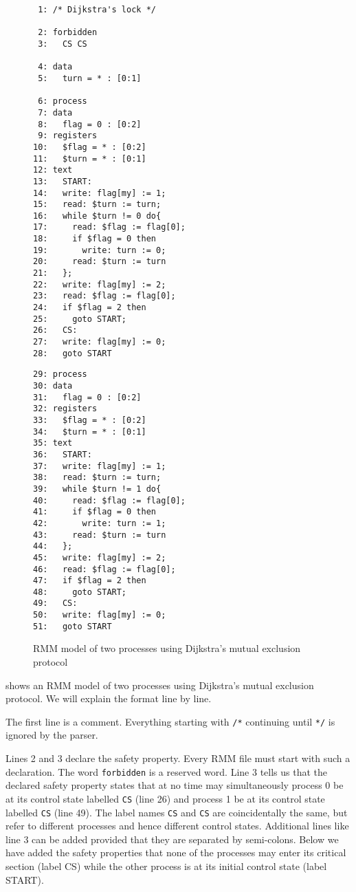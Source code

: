 \documentclass[a4paper]{article}
\begin{document}
\begin{figure}[ht]
\begin{minipage}[b]{0.5\linewidth}
\small{
\begin{verbatim}
 1: /* Dijkstra's lock */
   
 2: forbidden
 3:   CS CS
   
 4: data
 5:   turn = * : [0:1]
   
 6: process
 7: data
 8:   flag = 0 : [0:2]
 9: registers
10:   $flag = * : [0:2]
11:   $turn = * : [0:1]
12: text
13:   START:
14:   write: flag[my] := 1;
15:   read: $turn := turn;
16:   while $turn != 0 do{
17:     read: $flag := flag[0];
18:     if $flag = 0 then
19:       write: turn := 0;
20:     read: $turn := turn
21:   };
22:   write: flag[my] := 2;
23:   read: $flag := flag[0];
24:   if $flag = 2 then
25:     goto START;
26:   CS:
27:   write: flag[my] := 0;
28:   goto START
\end{verbatim}
}
\end{minipage}
\hspace{0pt}
\begin{minipage}[b]{0.45\linewidth}
\small{
\begin{verbatim}
29: process
30: data
31:   flag = 0 : [0:2]
32: registers
33:   $flag = * : [0:2]
34:   $turn = * : [0:1]
35: text
36:   START:
37:   write: flag[my] := 1;
38:   read: $turn := turn;
39:   while $turn != 1 do{
40:     read: $flag := flag[0];
41:     if $flag = 0 then
42:       write: turn := 1;
43:     read: $turn := turn
44:   };
45:   write: flag[my] := 2;
46:   read: $flag := flag[0];
47:   if $flag = 2 then
48:     goto START;
49:   CS:
50:   write: flag[my] := 0;
51:   goto START
\end{verbatim}
}
\end{minipage}
\caption{RMM model of two processes using Dijkstra's mutual exclusion protocol\cite{LP93}}\label{fig:code:dijkstra.rmm}
\end{figure}

 shows an RMM model of two processes using
Dijkstra's mutual exclusion protocol. We will explain the format line
by line.

The first line is a comment. Everything starting with \verb+/*+
continuing until \verb+*/+ is ignored by the parser.

Lines 2 and 3 declare the safety property. Every RMM file must start
with such a declaration. The word \verb+forbidden+ is a reserved
word. Line 3 tells us that the declared safety property states that at
no time may simultaneously process 0 be at its control state labelled
\verb+CS+ (line 26) and process 1 be at its control state labelled
\verb+CS+ (line 49). The label names \verb+CS+ and \verb+CS+ are
coincidentally the same, but refer to different processes and hence
different control states. Additional lines like line 3 can be added
provided that they are separated by semi-colons. Below we have added
the safety properties that none of the processes may enter its
critical section (label CS) while the other process is at its initial
control state (label START).
\end{document}
